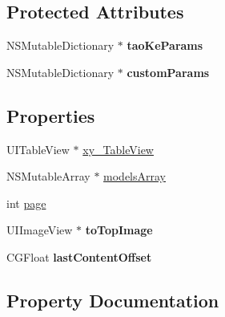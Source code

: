 \subsection*{Protected Attributes}
\begin{DoxyCompactItemize}
\item 
\mbox{\label{category_near_by_share_order_view_controller_07_08_a16c5e40ec930fcbec6c13ed75271ba98}} 
N\+S\+Mutable\+Dictionary $\ast$ {\bfseries tao\+Ke\+Params}
\item 
\mbox{\label{category_near_by_share_order_view_controller_07_08_ae885c2b91e3d670bd79036a315e4b4f4}} 
N\+S\+Mutable\+Dictionary $\ast$ {\bfseries custom\+Params}
\end{DoxyCompactItemize}
\subsection*{Properties}
\begin{DoxyCompactItemize}
\item 
U\+I\+Table\+View $\ast$ \mbox{\hyperlink{category_near_by_share_order_view_controller_07_08_a4dc303f73f5a5089dc212b9aca447a42}{xy\+\_\+\+Table\+View}}
\item 
N\+S\+Mutable\+Array $\ast$ \mbox{\hyperlink{category_near_by_share_order_view_controller_07_08_af7a248f13142f31875612351d8947f3b}{models\+Array}}
\item 
int \mbox{\hyperlink{category_near_by_share_order_view_controller_07_08_a2b11952bbcc4430888d1ff3bd1108339}{page}}
\item 
\mbox{\label{category_near_by_share_order_view_controller_07_08_acc7c9ad2800793c8265188ff6fe0251f}} 
U\+I\+Image\+View $\ast$ {\bfseries to\+Top\+Image}
\item 
\mbox{\label{category_near_by_share_order_view_controller_07_08_addcff8055e3333f5c5eb7f2683ce5bcc}} 
C\+G\+Float {\bfseries last\+Content\+Offset}
\end{DoxyCompactItemize}


\subsection{Property Documentation}
\mbox{\label{category_near_by_share_order_view_controller_07_08_af7a248f13142f31875612351d8947f3b}} 

